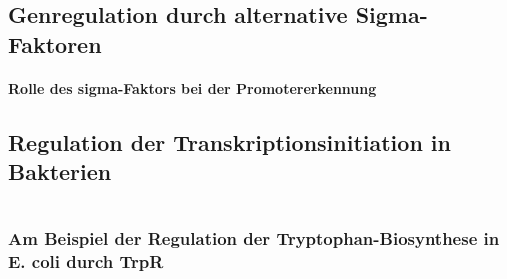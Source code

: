 
\subsection{Genregulation durch alternative Sigma-Faktoren}\label{subsec:genregulation-durch-alternative-sigma-faktoren}
\paragraph{Rolle des sigma-Faktors bei der Promotererkennung} %
\subsection{Regulation der Transkriptionsinitiation in Bakterien}\label{subsec:regulation-der-transkriptionsinitiation-in-bakterien}
\begin{table}[H]
    \centering
    \begin{tabular}{p{2cm} p{5cm} p{5cm}}
    \end{tabular}\label{tab:table2}
\end{table}
\subsubsection{Am Beispiel der Regulation der Tryptophan-Biosynthese
in E. coli durch TrpR}





